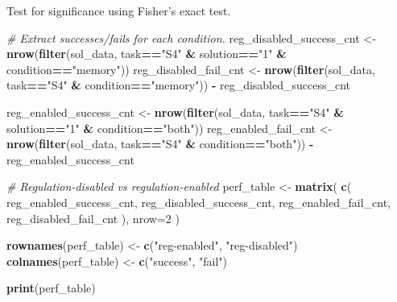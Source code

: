 \documentclass[
]{book}
\newenvironment{Shaded}{\begin{snugshade}}{\end{snugshade}}
\newcommand{\CommentTok}[1]{\textcolor[rgb]{0.56,0.35,0.01}{\textit{#1}}}
\newcommand{\DataTypeTok}[1]{\textcolor[rgb]{0.13,0.29,0.53}{#1}}
\newcommand{\DecValTok}[1]{\textcolor[rgb]{0.00,0.00,0.81}{#1}}
\newcommand{\KeywordTok}[1]{\textcolor[rgb]{0.13,0.29,0.53}{\textbf{#1}}}
\newcommand{\NormalTok}[1]{#1}
\newcommand{\OperatorTok}[1]{\textcolor[rgb]{0.81,0.36,0.00}{\textbf{#1}}}
\newcommand{\StringTok}[1]{\textcolor[rgb]{0.31,0.60,0.02}{#1}}
\begin{document}
Test for significance using Fisher's exact test.

\begin{Shaded}
\begin{Highlighting}[]
\CommentTok{\# Extract successes/fails for each condition.}
\NormalTok{reg\_disabled\_success\_cnt \textless{}{-}}\StringTok{ }\KeywordTok{nrow}\NormalTok{(}\KeywordTok{filter}\NormalTok{(sol\_data, task}\OperatorTok{==}\StringTok{"S4"} \OperatorTok{\&}\StringTok{ }\NormalTok{solution}\OperatorTok{==}\StringTok{"1"} \OperatorTok{\&}\StringTok{ }\NormalTok{condition}\OperatorTok{==}\StringTok{"memory"}\NormalTok{))}
\NormalTok{reg\_disabled\_fail\_cnt \textless{}{-}}\StringTok{ }\KeywordTok{nrow}\NormalTok{(}\KeywordTok{filter}\NormalTok{(sol\_data, task}\OperatorTok{==}\StringTok{"S4"} \OperatorTok{\&}\StringTok{ }\NormalTok{condition}\OperatorTok{==}\StringTok{"memory"}\NormalTok{)) }\OperatorTok{{-}}\StringTok{ }\NormalTok{reg\_disabled\_success\_cnt}

\NormalTok{reg\_enabled\_success\_cnt \textless{}{-}}\StringTok{ }\KeywordTok{nrow}\NormalTok{(}\KeywordTok{filter}\NormalTok{(sol\_data, task}\OperatorTok{==}\StringTok{"S4"} \OperatorTok{\&}\StringTok{ }\NormalTok{solution}\OperatorTok{==}\StringTok{"1"} \OperatorTok{\&}\StringTok{ }\NormalTok{condition}\OperatorTok{==}\StringTok{"both"}\NormalTok{))}
\NormalTok{reg\_enabled\_fail\_cnt \textless{}{-}}\StringTok{ }\KeywordTok{nrow}\NormalTok{(}\KeywordTok{filter}\NormalTok{(sol\_data, task}\OperatorTok{==}\StringTok{"S4"} \OperatorTok{\&}\StringTok{ }\NormalTok{condition}\OperatorTok{==}\StringTok{"both"}\NormalTok{)) }\OperatorTok{{-}}\StringTok{ }\NormalTok{reg\_enabled\_success\_cnt}

\CommentTok{\# Regulation{-}disabled vs regulation{-}enabled}
\NormalTok{perf\_table \textless{}{-}}\StringTok{ }\KeywordTok{matrix}\NormalTok{(}
  \KeywordTok{c}\NormalTok{(}
\NormalTok{    reg\_enabled\_success\_cnt,}
\NormalTok{    reg\_disabled\_success\_cnt,}
\NormalTok{    reg\_enabled\_fail\_cnt,}
\NormalTok{    reg\_disabled\_fail\_cnt}
\NormalTok{    ),}
    \DataTypeTok{nrow=}\DecValTok{2}
\NormalTok{)}

\KeywordTok{rownames}\NormalTok{(perf\_table) \textless{}{-}}\StringTok{ }\KeywordTok{c}\NormalTok{(}\StringTok{"reg{-}enabled"}\NormalTok{, }\StringTok{"reg{-}disabled"}\NormalTok{)}
\KeywordTok{colnames}\NormalTok{(perf\_table) \textless{}{-}}\StringTok{ }\KeywordTok{c}\NormalTok{(}\StringTok{"success"}\NormalTok{, }\StringTok{"fail"}\NormalTok{)}

\KeywordTok{print}\NormalTok{(perf\_table)}
\end{Highlighting}
\end{Shaded}
\end{document}
